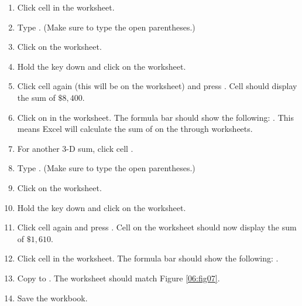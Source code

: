 \begin{enumbox}
	\begin{enumerate}
		\item Click cell  in the  worksheet.
		\item Type . (Make sure to type the open parentheses.)
		\item Click on the  worksheet.
		\item Hold the  key down and click on the  worksheet.
		\item Click cell  again (this will be on the  worksheet) and press . Cell  should display the sum of $ \$8,400 $.
		\item Click on  in the  worksheet. The formula bar should show the following: . This means Excel will calculate the sum of  on the  through  worksheets.
		\item For another $ 3 $-D sum, click cell .
		\item Type . (Make sure to type the open parentheses.)
		\item Click on the  worksheet.
		\item Hold the  key down and click on the  worksheet.
		\item Click cell  again and press . Cell  on the  worksheet should now display the sum of $ \$1,610 $.
		\item Click cell  in the  worksheet. The formula bar should show the following: .
		\item Copy  to . The  worksheet should match Figure \ref{06:fig07}.
		\item Save the  workbook.
	\end{enumerate}
\end{enumbox}

